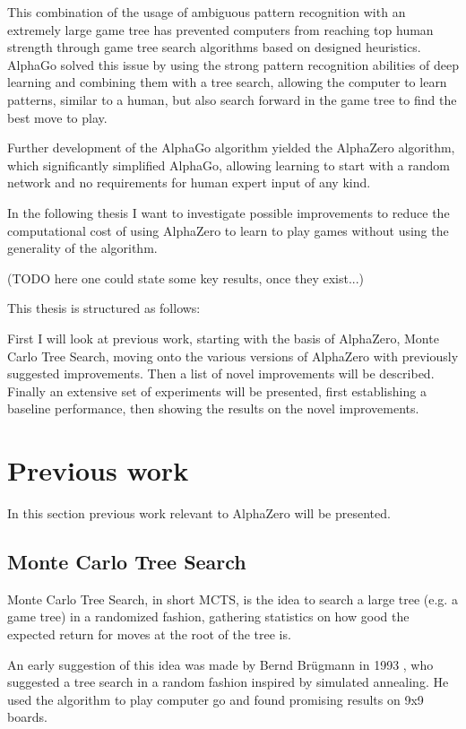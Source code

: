 \documentclass[12pt,onecolumn,oneside,titlepage]{article}
\begin{document}
This combination of the usage of ambiguous pattern recognition with an extremely large game tree has prevented computers from reaching top human strength through game tree search algorithms based on designed heuristics.
AlphaGo solved this issue by using the strong pattern recognition abilities of deep learning and combining them with a tree search, allowing the computer to learn patterns, similar to a human, but also search forward in the game tree to find the best move to play.

Further development of the AlphaGo algorithm yielded the AlphaZero algorithm, which significantly simplified AlphaGo, allowing learning to start with a random network and no requirements for human expert input of any kind.

In the following thesis I want to investigate possible improvements to reduce the computational cost of using AlphaZero to learn to play games without using the generality of the algorithm.

(TODO here one could state some key results, once they exist...)

This thesis is structured as follows:

First I will look at previous work, starting with the basis of AlphaZero, Monte Carlo Tree Search, moving onto the various versions of AlphaZero with previously suggested improvements.
Then a list of novel improvements will be described. Finally an extensive set of experiments will be presented, first establishing a baseline performance, then showing the results on the novel improvements.


\section{Previous work}

In this section previous work relevant to AlphaZero will be presented.

\subsection{Monte Carlo Tree Search}
\label{s:mcts}

Monte Carlo Tree Search, in short MCTS, is the idea to search a large tree (e.g. a game tree) in a randomized fashion, gathering statistics on how good the expected return for moves at the root of the tree is.

An early suggestion of this idea was made by Bernd Brügmann in 1993 \cite{montecarlogo1993}, who suggested a tree search in a random fashion inspired by simulated annealing. He used the algorithm to play computer go and found promising results on 9x9 boards.
\end{document}
